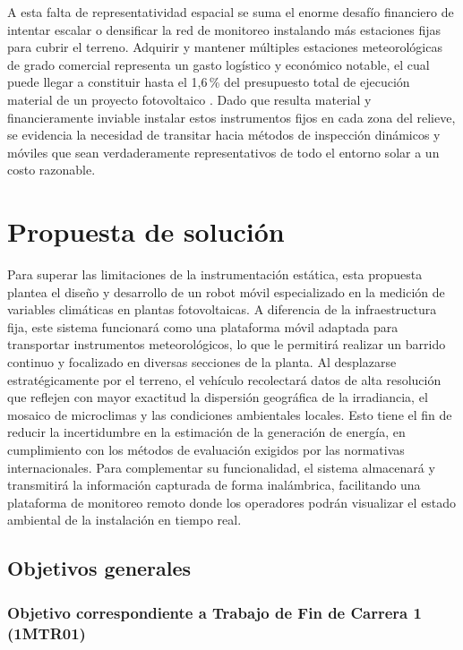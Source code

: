 A esta falta de representatividad espacial se suma el enorme desafío financiero de intentar escalar o densificar la red de monitoreo instalando más estaciones fijas para cubrir el terreno. Adquirir y mantener múltiples estaciones meteorológicas de grado comercial representa un gasto logístico y económico notable, el cual puede llegar a constituir hasta el 1,6\,\% del presupuesto total de ejecución material de un proyecto fotovoltaico \citep{Burriana5MW}. Dado que resulta material y financieramente inviable instalar estos instrumentos fijos en cada zona del relieve, se evidencia la necesidad de transitar hacia métodos de inspección dinámicos y móviles que sean verdaderamente representativos de todo el entorno solar a un costo razonable.

\section{Propuesta de solución}

Para superar las limitaciones de la instrumentación estática, esta propuesta plantea el diseño y desarrollo de un robot móvil especializado en la medición de variables climáticas en plantas fotovoltaicas. A diferencia de la infraestructura fija, este sistema funcionará como una plataforma móvil adaptada para transportar instrumentos meteorológicos, lo que le permitirá realizar un barrido continuo y focalizado en diversas secciones de la planta. Al desplazarse estratégicamente por el terreno, el vehículo recolectará datos de alta resolución que reflejen con mayor exactitud la dispersión geográfica de la irradiancia, el mosaico de microclimas y las condiciones ambientales locales. Esto tiene el fin de reducir la incertidumbre en la estimación de la generación de energía, en cumplimiento con los métodos de evaluación exigidos por las normativas internacionales. Para complementar su funcionalidad, el sistema almacenará y transmitirá la información capturada de forma inalámbrica, facilitando una plataforma de monitoreo remoto donde los operadores podrán visualizar el estado ambiental de la instalación en tiempo real.


\subsection{Objetivos generales}

\subsubsection{Objetivo correspondiente a Trabajo de Fin de Carrera 1 (1MTR01)}

